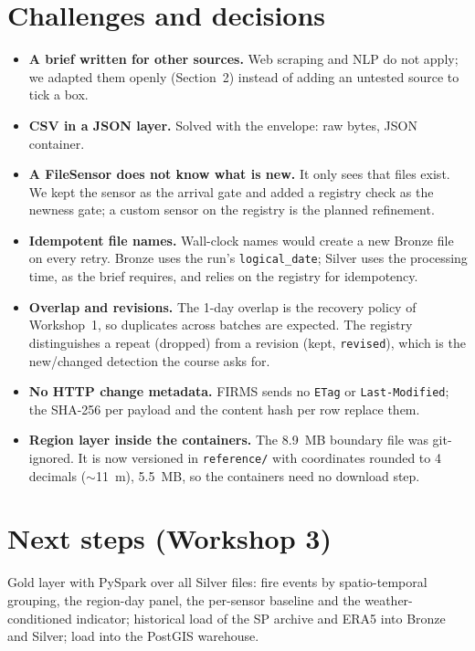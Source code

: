 \documentclass[11pt,a4paper]{article}
\newcommand{\code}[1]{\texttt{\small #1}}
\begin{document}
\section{Challenges and decisions}

\begin{itemize}
  \item \textbf{A brief written for other sources.} Web scraping and NLP do not apply; we adapted
        them openly (Section~2) instead of adding an untested source to tick a box.
  \item \textbf{CSV in a JSON layer.} Solved with the envelope: raw bytes, JSON container.
  \item \textbf{A FileSensor does not know what is new.} It only sees that files exist. We kept the
        sensor as the arrival gate and added a registry check as the newness gate; a custom sensor
        on the registry is the planned refinement.
  \item \textbf{Idempotent file names.} Wall-clock names would create a new Bronze file on every
        retry. Bronze uses the run's \code{logical\_date}; Silver uses the processing time, as the
        brief requires, and relies on the registry for idempotency.
  \item \textbf{Overlap and revisions.} The 1-day overlap is the recovery policy of Workshop~1, so
        duplicates across batches are expected. The registry distinguishes a repeat (dropped) from a
        revision (kept, \code{revised}), which is the new/changed detection the course asks for.
  \item \textbf{No HTTP change metadata.} FIRMS sends no \code{ETag} or \code{Last-Modified}; the
        SHA-256 per payload and the content hash per row replace them.
  \item \textbf{Region layer inside the containers.} The 8.9~MB boundary file was git-ignored. It is
        now versioned in \code{reference/} with coordinates rounded to 4 decimals ($\sim$11~m),
        5.5~MB, so the containers need no download step.
\end{itemize}

\section{Next steps (Workshop 3)}

Gold layer with PySpark over all Silver files: fire events by spatio-temporal grouping, the
region-day panel, the per-sensor baseline and the weather-conditioned indicator; historical load of
the SP archive and ERA5 into Bronze and Silver; load into the PostGIS warehouse.
\end{document}

